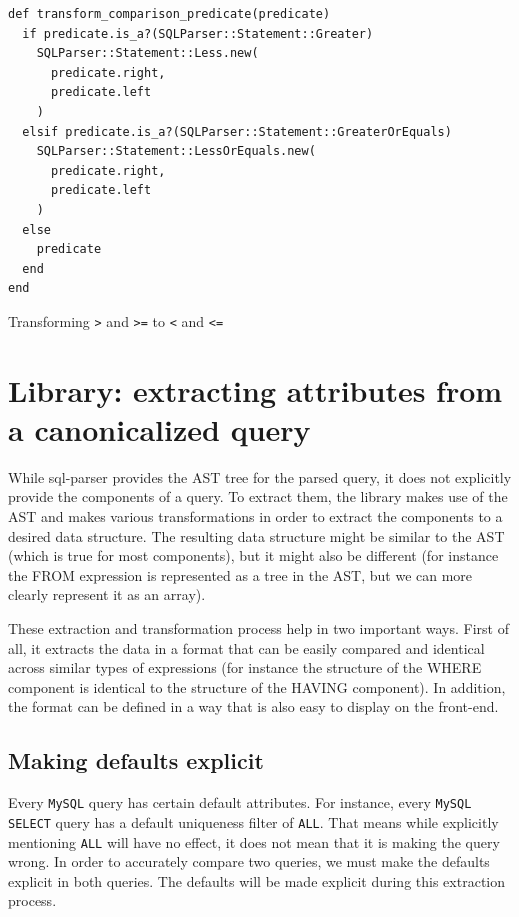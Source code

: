\begin{listing}
\begin{verbatim}
def transform_comparison_predicate(predicate)
  if predicate.is_a?(SQLParser::Statement::Greater)
    SQLParser::Statement::Less.new(
      predicate.right,
      predicate.left
    )
  elsif predicate.is_a?(SQLParser::Statement::GreaterOrEquals)
    SQLParser::Statement::LessOrEquals.new(
      predicate.right,
      predicate.left
    )
  else
    predicate
  end
end
\end{verbatim}
\caption{Transforming \texttt{>} and \texttt{>=} to \texttt{<} and \texttt{<=}}
\label{fig:transforming_great}
\end{listing}

\section{Library: extracting attributes from a canonicalized query}

While sql-parser provides the AST tree for the parsed query, it does not explicitly provide the components of a query. To extract them, the library makes use of the AST and makes various transformations in order to extract the components to a desired data structure. The resulting data structure might be similar to the AST (which is true for most components), but it might also be different (for instance the FROM expression is represented as a tree in the AST, but we can more clearly represent it as an array).

These extraction and transformation process help in two important ways. First of all, it extracts the data in a format that can be easily compared and identical across similar types of expressions (for instance the structure of the WHERE component is identical to the structure of the HAVING component). In addition, the format can be defined in a way that is also easy to display on the front-end.

\subsection{Making defaults explicit}

Every \texttt{MySQL} query has certain default attributes. For instance, every \texttt{MySQL SELECT} query has a default uniqueness filter of \texttt{ALL}. That means while explicitly mentioning \texttt{ALL} will have no effect, it does not mean that it is making the query wrong. In order to accurately compare two queries, we must make the defaults explicit in both queries. The defaults will be made explicit during this extraction process.

